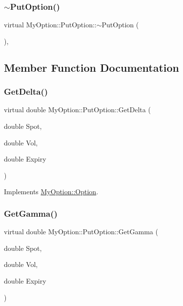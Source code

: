 \subsubsection{\texorpdfstring{$\sim$\+Put\+Option()}{~PutOption()}}
{\footnotesize\ttfamily virtual My\+Option\+::\+Put\+Option\+::$\sim$\+Put\+Option (\begin{DoxyParamCaption}{ }\end{DoxyParamCaption})\hspace{0.3cm}{\ttfamily [inline]}, {\ttfamily [virtual]}}



\subsection{Member Function Documentation}
\hypertarget{classMyOption_1_1PutOption_a7a248fe90a32f48e52e81dff2d11a40d}{}\label{classMyOption_1_1PutOption_a7a248fe90a32f48e52e81dff2d11a40d} 
\subsubsection{\texorpdfstring{Get\+Delta()}{GetDelta()}}
{\footnotesize\ttfamily virtual double My\+Option\+::\+Put\+Option\+::\+Get\+Delta (\begin{DoxyParamCaption}\item[{double}]{Spot,  }\item[{double}]{Vol,  }\item[{double}]{Expiry }\end{DoxyParamCaption})\hspace{0.3cm}{\ttfamily [virtual]}}



Implements \hyperlink{classMyOption_1_1Option_a4947bde99bb5e46b79aa0f36fd353d9b}{My\+Option\+::\+Option}.

\hypertarget{classMyOption_1_1PutOption_aaca54c52498c8809c84d4c6800827526}{}\label{classMyOption_1_1PutOption_aaca54c52498c8809c84d4c6800827526} 
\subsubsection{\texorpdfstring{Get\+Gamma()}{GetGamma()}}
{\footnotesize\ttfamily virtual double My\+Option\+::\+Put\+Option\+::\+Get\+Gamma (\begin{DoxyParamCaption}\item[{double}]{Spot,  }\item[{double}]{Vol,  }\item[{double}]{Expiry }\end{DoxyParamCaption})\hspace{0.3cm}{\ttfamily [virtual]}}



